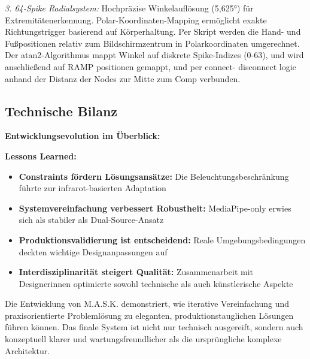 \textit{3. 64-Spike Radialsystem:}
Hochpräzise Winkelauflösung (5,625°) für Extremitätenerkennung. Polar-Koordinaten-Mapping ermöglicht exakte Richtungstrigger basierend auf Körperhaltung.
Per Skript werden die Hand- und Fußpositionen relativ zum Bildschirmzentrum in Polarkoordinaten umgerechnet. Der atan2-Algorithmus mappt Winkel auf diskrete Spike-Indizes (0-63),
und wird anschließend auf RAMP positionen gemappt, und per connect- disconnect logic anhand der Distanz der Nodes zur Mitte zum Comp verbunden.

\newpage

\subsection{Technische Bilanz}

\textbf{Entwicklungsevolution im Überblick:}
\begin{table}[H]
    \centering
    \caption{Systemevolution: Technische Verbesserungen über Entwicklungsphasen (Estimates ohne professionelle Messung!)}
    \label{tab:system_evolution}
\end{table}

\textbf{Lessons Learned:}
\begin{itemize}
    \item \textbf{Constraints fördern Lösungsansätze:} Die Beleuchtungsbeschränkung führte zur infrarot-basierten Adaptation
    \item \textbf{Systemvereinfachung verbessert Robustheit:} MediaPipe-only erwies sich als stabiler als Dual-Source-Ansatz
    \item \textbf{Produktionsvalidierung ist entscheidend:} Reale Umgebungsbedingungen deckten wichtige Designanpassungen auf
    \item \textbf{Interdisziplinarität steigert Qualität:} Zusammenarbeit mit Designerinnen optimierte sowohl technische als auch künstlerische Aspekte
\end{itemize}

Die Entwicklung von M.A.S.K. demonstriert, wie iterative Vereinfachung und praxisorientierte Problemlösung zu eleganten, produktionstauglichen Lösungen führen können. Das finale System ist nicht nur technisch ausgereift, sondern auch konzeptuell klarer und wartungsfreundlicher als die ursprüngliche komplexe Architektur.